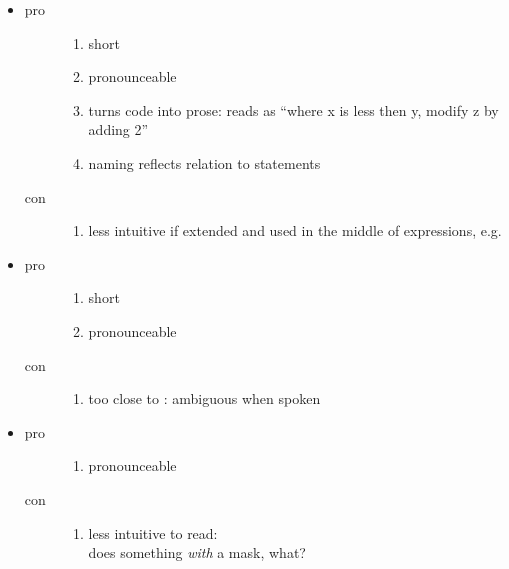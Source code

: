 \begin{itemize}
  \item {}
    \begin{description}
      \item[pro]
        \begin{enumerate}
          \item short
          \item pronounceable
          \item turns code into prose:  reads as “where x is less then y, modify z by adding 2”
          \item naming reflects relation to  statements
        \end{enumerate}
      \item[con]
        \begin{enumerate}
          \item less intuitive if extended and used in the middle of expressions, e.g. 
        \end{enumerate}
    \end{description}

  \item {}
    \begin{description}
      \item[pro]
        \begin{enumerate}
          \item short
          \item pronounceable
        \end{enumerate}
      \item[con]
        \begin{enumerate}
          \item too close to : ambiguous when spoken
        \end{enumerate}
    \end{description}

  \item {}
    \begin{description}
      \item[pro]
        \begin{enumerate}
          \item pronounceable
        \end{enumerate}
      \item[con]
        \begin{enumerate}
          \item less intuitive to read: \\
            does something \emph{with} a mask, what?
        \end{enumerate}
    \end{description}


\end{itemize}
